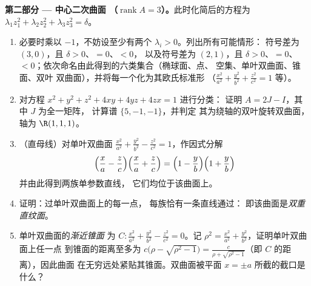 \begin{problem}
\medskip
\noindent\textbf{第二部分 --- 中心二次曲面
（$\operatorname{rank}A = 3$）。}此时化简后的方程为
$\lambda_1z_1^2 + \lambda_2z_2^2 + \lambda_3z_3^2 = \delta$。
\begin{enumerate}[resume]
  \item 必要时乘以 $-1$，不妨设至少有两个
        $\lambda_i > 0$。列出所有可能情形：
        符号差为 $(3, 0)$，且 $\delta > 0$、$= 0$、$< 0$，
        以及符号差为 $(2, 1)$，且 $\delta > 0$、$= 0$、$<
        0$；依次命名由此得到的六类集合（椭球面、点、
        空集、单叶双曲面、锥面、双叶
        双曲面），并将每一个化为其欧氏标准形
        （$\frac{x^2}{a^2} + \frac{y^2}{b^2} +
        \frac{z^2}{c^2} = 1$ 等）。
  \item 对方程 $x^2 + y^2 + z^2 + 4xy + 4yz + 4zx = 1$ 进行分类：
        证明 $A = 2J - I$，其中 $J$ 为全一矩阵，
        计算谱 $\{5, -1, -1\}$，并判定
        其为绕轴的双叶旋转双曲面，轴为
        $\R(1,1,1)$。
  \item （直母线）对单叶双曲面
        $\frac{x^2}{a^2} + \frac{y^2}{b^2} - \frac{z^2}{c^2}
        = 1$，作因式分解
        \[
        \Bigl(\frac xa - \frac zc\Bigr)
        \Bigl(\frac xa + \frac zc\Bigr)
        = \Bigl(1 - \frac yb\Bigr)\Bigl(1 + \frac yb\Bigr)
        \]
        并由此得到两族单参数直线，
        它们均位于该曲面上。
  \item 证明：过单叶双曲面上的每一点，
        每族恰有一条直线通过：
        即该曲面是\emph{双重直纹面}。
  \item 单叶双曲面的\emph{渐近锥面}
        为 $C : \frac{x^2}{a^2} + \frac{y^2}{b^2}
        - \frac{z^2}{c^2} = 0$。记 $\rho^2 = \frac{x^2}{a^2}
        + \frac{y^2}{b^2}$，证明单叶双曲面上任一点
        到锥面的距离至多为 $c\bigl(\rho -
        \sqrt{\rho^2 - 1}\bigr) = \frac{c}{\rho +
        \sqrt{\rho^2 - 1}}$（即 $C$ 的距离），因此曲面
        在无穷远处紧贴其锥面。双曲面被平面
        $x = \pm a$ 所截的截口是什么？
\end{enumerate}


\end{problem}
